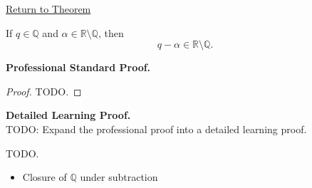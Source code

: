 \newpage
{}
\label{prf:rational-minus-irrational-is-irrational}

\begin{remark*}[Return]
\hyperref[thm:rational-minus-irrational-is-irrational]{Return to Theorem}
\end{remark*}

\begin{theorem*}
If $q\in\mathbb{Q}$ and $\alpha\in\mathbb{R}\setminus\mathbb{Q}$, then
\[
q-\alpha\in\mathbb{R}\setminus\mathbb{Q}.
\]
\end{theorem*}

\textbf{Professional Standard Proof.}~\\
\begin{proof}
TODO.
\end{proof}

\textbf{Detailed Learning Proof.}~\\
TODO: Expand the professional proof into a detailed learning proof.


\begin{remark*}
TODO.
\end{remark*}

\begin{dependencies}
\begin{itemize}
  \item Closure of $\mathbb{Q}$ under subtraction
\end{itemize}
\end{dependencies}

